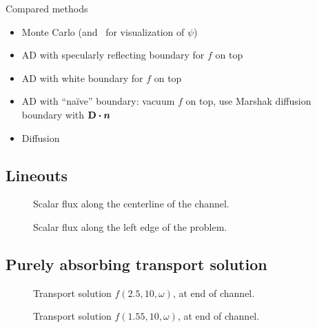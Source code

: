 \documentclass{beamer}
\begin{document}
\begin{frame}{Compared methods}
  \begin{itemize}
    \item Monte Carlo (and \SN\ for visualization of $\psi$)
    \item AD with specularly reflecting boundary for $f$ on top
    \item AD with white boundary for $f$ on top
    \item AD with ``na\"ive'' boundary: vacuum $f$ on top, use Marshak diffusion
      boundary with $\mathbf{D} \bm{\cdot} \bm{n}$
    \item Diffusion
  \end{itemize}
\end{frame}

\subsection{Lineouts}
\begin{frame}
\begin{figure}[tb]
  \centering
  
  \caption{Scalar flux along the centerline of the channel.}
  \label{fig:phiChannel}
\end{figure}
\end{frame}

\begin{frame}
\begin{figure}[tb]
  \centering
  
  \caption{Scalar flux along the left edge of the problem.}
  \label{fig:phiLeft}
\end{figure}
\end{frame}

\subsection{Purely absorbing transport solution}
\begin{frame}
\begin{figure}[tb]
  \centering
  
  \caption{Transport solution $f(2.5,10,\omega)$, at end of channel.}
  \label{fig:fMid}
\end{figure}
\end{frame}

\begin{frame}
\begin{figure}[tb]
  \centering
  
  \caption{Transport solution $f(1.55,10,\omega)$, at end of channel.}
  \label{fig:fLeft}
\end{figure}
\end{frame}
\end{document}
